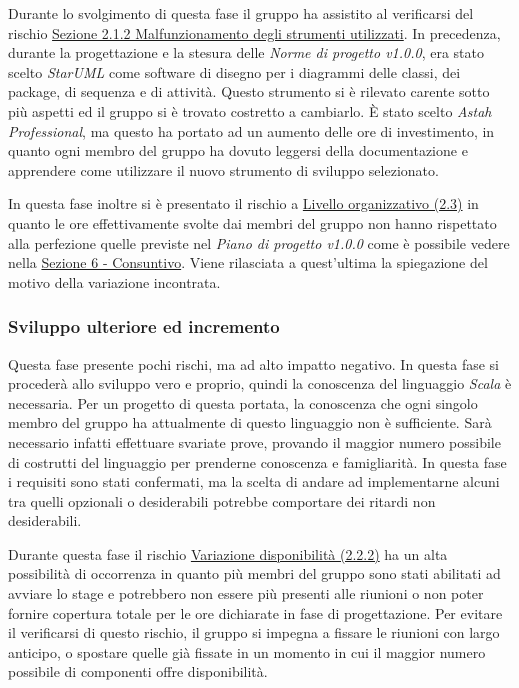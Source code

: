 \documentclass[a4paper]{article}
\begin{document}
				Durante lo svolgimento di questa fase il gruppo ha assistito al verificarsi del rischio 
				\hyperref[MalfunzionamentoStrumenti]{Sezione 2.1.2 Malfunzionamento degli strumenti utilizzati}. 
				In precedenza, durante la progettazione e la stesura delle \emph{Norme di progetto v1.0.0}, era stato scelto \emph{StarUML} come 
				software di disegno per i diagrammi delle classi, dei package, di sequenza e di attività. Questo strumento si è rilevato  carente sotto 
				più aspetti ed il gruppo si è trovato costretto a cambiarlo.
				È stato scelto \emph{Astah Professional}, ma questo ha portato ad un aumento delle ore di investimento, in quanto ogni membro del gruppo 
				ha dovuto leggersi della documentazione e apprendere come utilizzare il nuovo strumento di sviluppo selezionato.
				
				In questa fase inoltre si è presentato il rischio a \hyperref[LivelloOrganizzativo]{Livello organizzativo (2.3)} in quanto le ore effettivamente 
				svolte dai membri del gruppo non hanno rispettato alla perfezione quelle previste nel \emph{Piano di progetto v1.0.0} come è possibile vedere 
				nella \hyperref[Consuntivo]{Sezione 6 - Consuntivo}. Viene rilasciata a quest'ultima la spiegazione del motivo della variazione incontrata.
				
			\subsubsection{Sviluppo ulteriore ed incremento}
                Questa fase presente pochi rischi, ma ad alto impatto negativo. In questa fase si procederà allo sviluppo vero e proprio, quindi la conoscenza 
                del linguaggio \emph{Scala} è necessaria. Per un progetto di questa portata, la conoscenza che ogni singolo membro del gruppo ha attualmente di 
                questo linguaggio non è sufficiente. Sarà necessario infatti effettuare svariate prove, provando il maggior numero possibile di costrutti del 
                linguaggio per prenderne conoscenza e famigliarità. In questa fase i requisiti sono stati confermati, ma la scelta di andare ad implementarne 
                alcuni tra quelli opzionali o desiderabili potrebbe comportare dei ritardi non desiderabili.
				
				Durante questa fase il rischio \hyperref[VariazioneDisponibilita]{Variazione disponibilità (2.2.2)} ha un alta possibilità di occorrenza in quanto 
				più membri del gruppo sono stati abilitati ad avviare lo stage e potrebbero non essere più presenti alle riunioni o non poter fornire copertura 
				totale per le ore dichiarate in fase di progettazione. Per evitare il verificarsi di questo rischio, il gruppo si impegna a fissare le riunioni 
				con largo anticipo, o spostare quelle già fissate in un momento in cui il maggior numero possibile di componenti offre disponibilità. 
				
\end{document}
